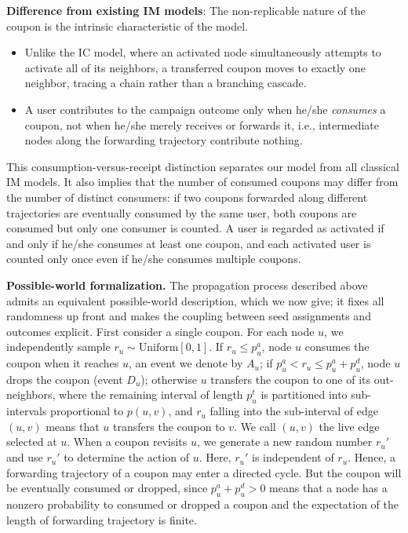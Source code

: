 \documentclass[sigconf]{acmart}
\begin{document}
\textbf{Difference from existing IM models}: The non-replicable nature of the coupon is the intrinsic 
characteristic of the model.
\begin{itemize}
 \item Unlike the IC model, where an activated node simultaneously attempts
to activate all of its neighbors, a transferred coupon moves to
exactly one neighbor, tracing a chain rather than a branching cascade.

 \item A user contributes to the campaign outcome only when he/she
\emph{consumes} a coupon, not when he/she merely receives or forwards
it, i.e., intermediate nodes along the forwarding trajectory contribute
nothing.
\end{itemize}
This consumption-versus-receipt distinction separates our model from
all classical IM models.
It also implies that the number of consumed coupons may differ from
the number of distinct consumers: if two coupons forwarded along
different trajectories are eventually consumed by the same user, both
coupons are consumed but only one consumer is counted.
A user is regarded as activated if and only if he/she consumes at least
one coupon, and each activated user is counted only once even if he/she
consumes multiple coupons.

\textbf{Possible-world formalization.}
The propagation process described above admits an equivalent
possible-world description, which we now give; it fixes all randomness
up front and makes the coupling between seed assignments and outcomes
explicit.
First consider a single coupon.
For each node $u$, we independently sample
$r_u\sim\mathrm{Uniform}[0,1]$.
If $r_u\le p_u^a$, node $u$ consumes the coupon when it reaches $u$,
an event we denote by $A_u$; if $p_u^a<r_u\le p_u^a+p_u^d$, node $u$
drops the coupon (event $D_u$); otherwise $u$ transfers the coupon to
one of its out-neighbors, where the remaining interval of length
$p_u^t$ is partitioned into sub-intervals proportional to $p(u,v)$,
and $r_u$ falling into the sub-interval of edge $(u,v)$ means that
$u$ transfers the coupon to $v$.
We call $(u,v)$ the live edge selected at $u$.
When a coupon revisits $u$, we generate a new random number $r_u'$ and use  $r_u'$ to determine the 
action of $u$. Here, $r_u'$ is independent of $r_u$. Hence, a forwarding trajectory of a coupon may enter a directed cycle. But the coupon will be eventually consumed or dropped, since $p_u^a+p_u^d>0$ means that a node has a nonzero probability to consumed or dropped a coupon and the expectation of the length of forwarding trajectory is finite.
\end{document}
